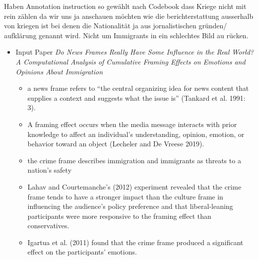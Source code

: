 \documentclass[11pt,titlepage,oneside,openany]{article}
\begin{document}
Haben Annotation instruction so gewählt nach Codebook dass Kriege nicht mit rein zählen da wir uns ja anschauen möchten wie die berichterstattung ausserhalb von kriegen ist bei denen die Nationalität ja aus jornalistischen gründen/ aufklärung genannt wird. 
Nicht um Immigrants in ein schlechtes Bild au rücken. 

\begin{itemize} 
\item Input Paper \textit{Do News Frames Really Have Some Influence in the Real World? A Computational Analysis of Cumulative Framing Effects on Emotions and Opinions About Immigration}
    \begin{itemize}
        \item a news frame refers to “the central organizing idea for news content that supplies a context and suggests what the issue is” (Tankard et al. 1991: 3).
        \item A framing effect occurs when the media message interacts with prior knowledge to affect an individual’s understanding, opinion, emotion, or behavior toward an object (Lecheler and De Vreese 2019). 
        \item the crime frame describes immigration and immigrants as threats to a nation’s safety
        \item Lahav and Courtemanche’s (2012) experiment revealed that the crime frame tends to have a stronger impact than the culture frame in influencing the audience’s policy preference and that liberal-leaning participants were more responsive to the framing effect than conservatives.
        \item Igartua et al. (2011) found that the crime frame produced a significant effect on the participants’ emotions.
    \end{itemize}
\end{itemize}
\end{document}
